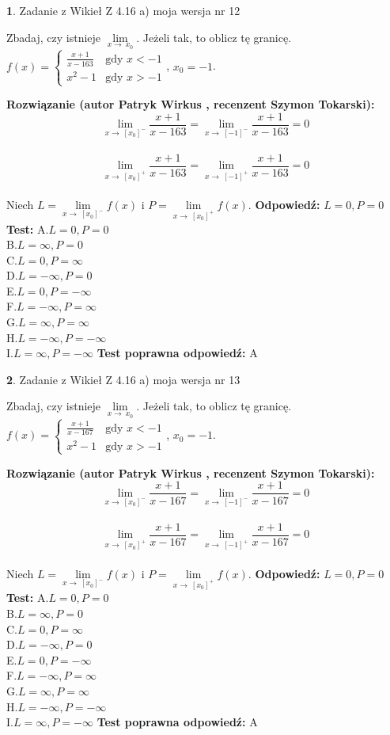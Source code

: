\documentclass[12pt, a4paper]{article}
\theoremstyle{definition} %
\newtheorem{zad}{}
\newcommand{\zadStart}[1]{\begin{zad}#1\newline}
\newcommand{\zadStop}{\end{zad}}
\newcommand{\rozwStart}[2]{\noindent \textbf{Rozwiązanie (autor #1 , recenzent #2): }\newline}
\newcommand{\rozwStop}{\newline}
\newcommand{\odpStart}{\noindent \textbf{Odpowiedź:}\newline}
\newcommand{\odpStop}{\newline}
\newcommand{\testStart}{\noindent \textbf{Test:}\newline}
\newcommand{\testStop}{\newline}
\newcommand{\kluczStart}{\noindent \textbf{Test poprawna odpowiedź:}\newline}
\newcommand{\kluczStop}{\newline}
\begin{document}
\zadStart{Zadanie z Wikieł Z 4.16 a) moja wersja nr 12}

Zbadaj, czy istnieje $\lim\limits_{x\to\ x_{0}}$. Jeżeli tak, to oblicz tę granicę.\\   $f(x) = \left\{ \begin{array}{ll}
\frac{x+1}{x-163} & \textrm{gdy $x<-1$}\\
x^{2}-1 & \textrm{gdy $x>-1$}
\end{array} \right.$, $x_{0}=-1$.
\zadStop
\rozwStart{Patryk Wirkus}{Szymon Tokarski}
$$\lim\limits_{x\to\ [x_{0}]^{-}}\frac{x+1}{x-163} = \lim\limits_{x\to\ [-1]^{-}}\frac{x+1}{x-163} = 0$$
\\
$$\lim\limits_{x\to\ [x_{0}]^{+}}\frac{x+1}{x-163} = \lim\limits_{x\to\ [-1]^{+}}\frac{x+1}{x-163} = 0$$
\\
Niech $L=\lim\limits_{x\to\ [x_{0}]^{-}}f(x)$ i $P=\lim\limits_{x\to\ [x_{0}]^{+}}f(x)$.
\rozwStop
\odpStart
$L=0, P=0$
\odpStop
\testStart
A.$L=0, P=0$\\ B.$L=\infty, P=0$\\ C.$L=0, P=\infty$\\ D.$L=-\infty, P=0$\\ E.$L=0, P=-\infty$\\
F.$L=-\infty, P=\infty$\\ G.$L=\infty, P=\infty$\\
H.$L=-\infty, P=-\infty$\\
I.$L=\infty, P=-\infty$
\testStop
\kluczStart
A
\kluczStop



\zadStart{Zadanie z Wikieł Z 4.16 a) moja wersja nr 13}

Zbadaj, czy istnieje $\lim\limits_{x\to\ x_{0}}$. Jeżeli tak, to oblicz tę granicę.\\   $f(x) = \left\{ \begin{array}{ll}
\frac{x+1}{x-167} & \textrm{gdy $x<-1$}\\
x^{2}-1 & \textrm{gdy $x>-1$}
\end{array} \right.$, $x_{0}=-1$.
\zadStop
\rozwStart{Patryk Wirkus}{Szymon Tokarski}
$$\lim\limits_{x\to\ [x_{0}]^{-}}\frac{x+1}{x-167} = \lim\limits_{x\to\ [-1]^{-}}\frac{x+1}{x-167} = 0$$
\\
$$\lim\limits_{x\to\ [x_{0}]^{+}}\frac{x+1}{x-167} = \lim\limits_{x\to\ [-1]^{+}}\frac{x+1}{x-167} = 0$$
\\
Niech $L=\lim\limits_{x\to\ [x_{0}]^{-}}f(x)$ i $P=\lim\limits_{x\to\ [x_{0}]^{+}}f(x)$.
\rozwStop
\odpStart
$L=0, P=0$
\odpStop
\testStart
A.$L=0, P=0$\\ B.$L=\infty, P=0$\\ C.$L=0, P=\infty$\\ D.$L=-\infty, P=0$\\ E.$L=0, P=-\infty$\\
F.$L=-\infty, P=\infty$\\ G.$L=\infty, P=\infty$\\
H.$L=-\infty, P=-\infty$\\
I.$L=\infty, P=-\infty$
\testStop
\kluczStart
A
\kluczStop
\end{document}
